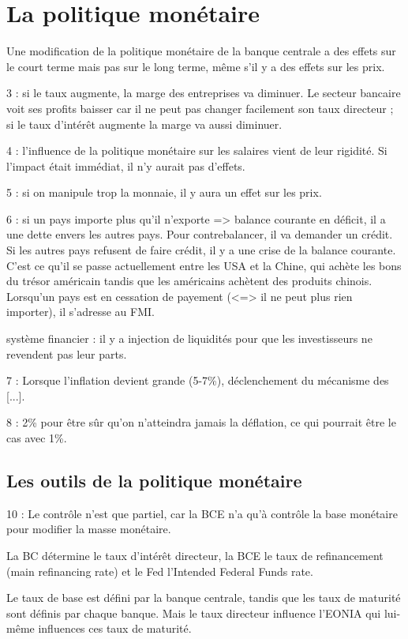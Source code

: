 \chapter{La politique monétaire}

Une modification de la politique monétaire de la banque centrale a des effets sur le court terme mais pas sur le long terme, même s'il y a des effets sur les prix.

3 : si le taux augmente, la marge des entreprises va diminuer. Le secteur bancaire voit ses profits baisser car il ne peut pas changer facilement son taux directeur ; si le taux d'intérêt augmente la marge va aussi diminuer.

4 : l'influence de la politique monétaire sur les salaires vient de leur rigidité. Si l'impact était immédiat, il n'y aurait pas d'effets.

5 : si on manipule trop la monnaie, il y aura un effet sur les prix.

6 : si un pays importe plus qu'il n'exporte => balance courante en déficit, il a une dette envers les autres pays. Pour contrebalancer, il va demander un crédit. Si les autres pays refusent de faire crédit, il y a une crise de la balance courante. C'est ce qu'il se passe actuellement entre les USA et la Chine, qui achète les bons du trésor américain tandis que les américains achètent des produits chinois. Lorsqu'un pays est en cessation de payement (<=> il ne peut plus rien importer), il s'adresse au FMI.

système financier : il y a injection de liquidités pour que les investisseurs ne revendent pas leur parts.

7 : Lorsque l'inflation devient grande (5-7\%), déclenchement du mécanisme des [...].

8 : 2\% pour être sûr qu'on n'atteindra jamais la déflation, ce qui pourrait être le cas avec 1\%.

\section{Les outils de la politique monétaire}

10 : Le contrôle n'est que partiel, car la BCE n'a qu'à contrôle la base monétaire pour modifier la masse monétaire.

La BC détermine le taux d'intérêt directeur, la BCE le taux de refinancement (main refinancing rate) et le Fed l'Intended Federal Funds rate.

Le taux de base est défini par la banque centrale, tandis que les taux de maturité sont définis par chaque banque. Mais le taux directeur influence l'EONIA qui lui-même influences ces taux de maturité.

